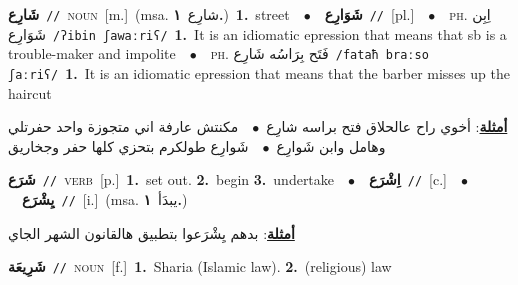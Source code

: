\documentclass[10pt,a4paper,twoside]{article} %
\begin{document}
\begin{multicols}{2}
{\setlength\topsep{0pt}\textbf{\foreignlanguage{arabic}{شَارِع}}\ {\color{gray}\texttt{//}\color{black}}\ \textsc{noun}\ [m.]\ \color{gray}(msa. \foreignlanguage{arabic}{شارِع}~\foreignlanguage{arabic}{\textbf{١.}})\color{black}\ \textbf{1.}~street\ \ $\bullet$\ \ \setlength\topsep{0pt}\textbf{\foreignlanguage{arabic}{شَوَارِع}}\ {\color{gray}\texttt{//}\color{black}}\ [pl.]\ \ $\bullet$\ \ \textsc{ph.} \color{gray} \foreignlanguage{arabic}{اِبِن شَوَارِع}\color{black}\ {\color{gray}\texttt{/{\sffamily ʔibin ʃawaːriʕ}/}\color{black}}\ \textbf{1.}~It is an idiomatic epression that means that sb is a trouble-maker and impolite\ \ $\bullet$\ \ \textsc{ph.} \color{gray} \foreignlanguage{arabic}{فَتَح بِرَاسُه شَارِع}\color{black}\ {\color{gray}\texttt{/{\sffamily fataħ braːso ʃaːriʕ}/}\color{black}}\ \textbf{1.}~It is an idiomatic epression that means that the barber misses up the haircut\  \begin{flushright}\color{gray}\foreignlanguage{arabic}{\textbf{\underline{\foreignlanguage{arabic}{أمثلة}}}: أخوي راح عالحلاق فتح براسه شارِع\ $\bullet$\ \  مكنتش عارفة اني متجوزة واحد حفرتلي وهامل وابن شَوارِع\ $\bullet$\ \  شَوارِع طولكرم بتحزي كلها حفر وجخاريق}\end{flushright}\color{black}} \vspace{2mm}

{\setlength\topsep{0pt}\textbf{\foreignlanguage{arabic}{شَرَع}}\ {\color{gray}\texttt{//}\color{black}}\ \textsc{verb}\ [p.]\ \textbf{1.}~set out.  \textbf{2.}~begin  \textbf{3.}~undertake\ \ $\bullet$\ \ \setlength\topsep{0pt}\textbf{\foreignlanguage{arabic}{اِشْرَع}}\ {\color{gray}\texttt{//}\color{black}}\ [c.]\ \ $\bullet$\ \ \setlength\topsep{0pt}\textbf{\foreignlanguage{arabic}{يِشْرَع}}\ {\color{gray}\texttt{//}\color{black}}\ [i.]\ \color{gray}(msa. \foreignlanguage{arabic}{يبدَأ}~\foreignlanguage{arabic}{\textbf{١.}})\color{black}\  \begin{flushright}\color{gray}\foreignlanguage{arabic}{\textbf{\underline{\foreignlanguage{arabic}{أمثلة}}}: بدهم يِشْرَعوا بتطبيق هالقانون الشهر الجاي}\end{flushright}\color{black}} \vspace{2mm}

{\setlength\topsep{0pt}\textbf{\foreignlanguage{arabic}{شَرِيعَة}}\ {\color{gray}\texttt{//}\color{black}}\ \textsc{noun}\ [f.]\ \textbf{1.}~Sharia (Islamic law).  \textbf{2.}~(religious) law\ } \vspace{2mm}


\end{multicols}
\end{document}

